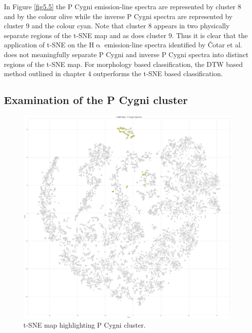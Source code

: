 In Figure \ref{fig5.5} the P Cygni emission-line spectra are represented by cluster 8 and by the colour olive while the inverse P Cygni spectra are represented by cluster 9 and the colour cyan. Note that cluster 8 appears in two physically separate regions of the t-SNE map and as does cluster 9. Thus it is clear that the application of t-SNE on the H$\upalpha$ emission-line spectra identified by Čotar et al. does not meaningfully separate P Cygni and inverse P Cygni spectra into distinct regions of the t-SNE map. For morphology based classification, the DTW based method outlined in chapter 4 outperforms the t-SNE based classification.

\subsection{Examination of the P Cygni cluster}

\begin{figure}[!htb]
\centering
\includegraphics[scale=0.14]{figures/t-sne p cygni only.png}
\caption{t-SNE map highlighting P Cygni cluster.}
\end{figure}

